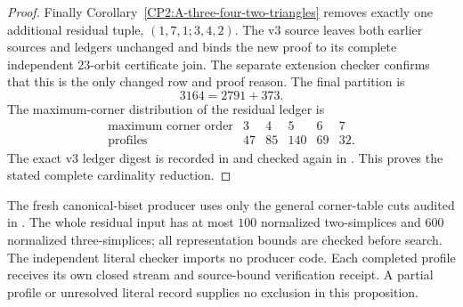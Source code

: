 \begin{proof}
Finally Corollary~\ref{CP2:A-three-four-two-triangles}
removes exactly one additional residual tuple,
$(1,7,1;3,4,2)$. The v3 source leaves both earlier
sources and ledgers unchanged and binds the new proof
to its complete independent $23$-orbit certificate join.
The separate extension checker confirms that this is the
only changed row and proof reason. The final partition is
\[
 3164=2791+373.
\]
The maximum-corner distribution of the residual ledger is
\[
\begin{array}{c|rrrrr}
\text{maximum corner order}&3&4&5&6&7\\\hline
\text{profiles}&47&85&140&69&32.
\end{array}
\]
The exact v3 ledger digest is recorded in
 and checked
again in
.
This proves the stated complete cardinality reduction.
\end{proof}

\begin{remark*}
The fresh canonical-biset producer
 uses only
the general corner-table cuts audited in
.
The whole residual input has at most $100$ normalized
two-simplices and $600$ normalized three-simplices;
all representation bounds are checked before search.
The independent literal checker imports no producer
code. Each completed profile receives its own closed
stream and source-bound verification receipt. A partial
profile or unresolved literal record supplies no
exclusion in this proposition.
\end{remark*}
